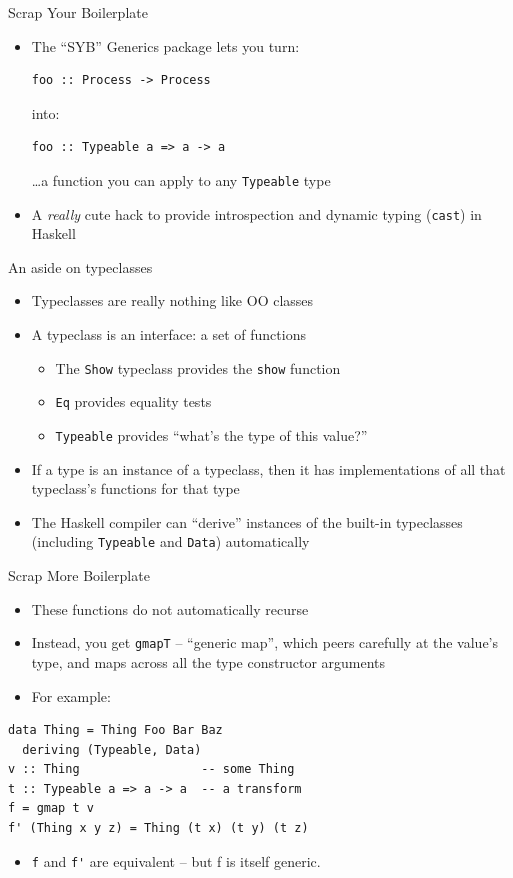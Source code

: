\documentclass[adam,pdf,slideColor]{prosper}
\begin{document}
\begin{slide}{Scrap Your Boilerplate}
\begin{itemize}
\item The ``SYB'' Generics package lets you turn:
\begin{verbatim}
foo :: Process -> Process
\end{verbatim}
into:
\begin{verbatim}
foo :: Typeable a => a -> a
\end{verbatim}
\ldots a function you can apply to any \verb|Typeable| type
\item A \emph{really} cute hack to provide introspection and dynamic
  typing (\verb|cast|) in Haskell
\end{itemize}
\end{slide}

\begin{slide}{An aside on typeclasses}
\begin{itemize}
\item Typeclasses are really nothing like OO classes
\item A typeclass is an interface: a set of functions
\begin{itemize}
\item The \verb|Show| typeclass provides the \verb|show| function
\item \verb|Eq| provides equality tests
\item \verb|Typeable| provides ``what's the type of this value?''
\end{itemize}
\item If a type is an instance of a typeclass, then it has
  implementations of all that typeclass's functions for that type
\item The Haskell compiler can ``derive'' instances of the built-in
  typeclasses (including \verb|Typeable| and \verb|Data|) automatically
\end{itemize}
\end{slide}

\begin{slide}{Scrap More Boilerplate}
\begin{itemize}
\item These functions do not automatically recurse
\item Instead, you get \verb|gmapT| -- ``generic map'', which peers
  carefully at the value's type, and maps across all the type
  constructor arguments
\item For example:
\end{itemize}
\begin{verbatim}
data Thing = Thing Foo Bar Baz
  deriving (Typeable, Data)
v :: Thing                 -- some Thing
t :: Typeable a => a -> a  -- a transform
f = gmap t v
f' (Thing x y z) = Thing (t x) (t y) (t z)
\end{verbatim}
\begin{itemize}
\item \verb|f| and \verb|f'| are equivalent -- but f is itself generic.
\end{itemize}
\end{slide}
\end{document}
